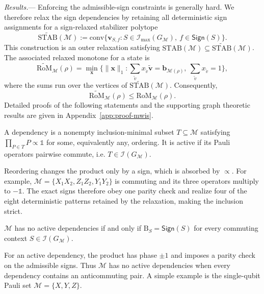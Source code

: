 \documentclass[10pt,aps,pra,twocolumn,floatfix,nofootinbib,superscriptaddress,longbibliography]{revtex4-2}
\newcommand{\Mcal}{\mathcal M}
\newcommand{\STAB}{\mathrm{STAB}}
\newcommand{\RoM}{\mathrm{RoM}}
\newcommand{\conv}{\mathrm{conv}}
\newcommand{\Ind}{\mathcal I}
\newcommand{\Bset}{\mathrm B}
\providecommand{\mathbm}[1]{\bm{#1}}
\begin{document}
	
	\emph{Results.}---
	\label{sec:results}
	Enforcing the admissible-sign constraints is generally hard.
	We therefore relax the sign dependencies by retaining all deterministic sign assignments for a sign-relaxed stabilizer polytope
	{\small
		\begin{equation}
			\widetilde{\STAB}(\Mcal)
			:=\conv\{\mathbm{v}_{S,f}:S\in\Ind_{\max}(G_\Mcal),\ f\in\mathsf{Sign}(S)\}.
			\label{eq:relaxed-polytope}
		\end{equation}
	}
	This construction is an outer relaxation satisfying $\STAB(\Mcal)\subseteq\widetilde{\STAB}(\Mcal)$.
	The associated relaxed monotone for a state is
	{\small
		\begin{equation}
			\widetilde{\RoM}_\Mcal(\rho)=\min_{\mathbm{x}}\!\Big\{\|\mathbm{x}\|_1:\!\textstyle\sum_{\tilde v}x_{\tilde v}\tilde{\mathbm{v}}=\mathbm{b}_{\Mcal(\rho)},\ \textstyle\sum_{\tilde v}x_{\tilde v}=1\Big\},
			\label{eq:relaxed-rom}
		\end{equation}
	}
	where the sums run over the vertices of $\widetilde{\STAB}(\Mcal)$.
	Consequently,
	\begin{equation}
		\widetilde{\RoM}_\Mcal(\rho)\le\RoM_\Mcal(\rho).
		\label{eq:relaxed-lower-bound}
	\end{equation}
	Detailed proofs of the following statements and the supporting graph theoretic results are given in Appendix~\ref{app:proof-mwis}.
	\begin{definition}
		\label{def:active}
		A dependency is a nonempty inclusion-minimal subset $T\subseteq\Mcal$ satisfying $\prod_{P\in T}P\propto\mathbb{1}$ for some, equivalently any, ordering.
		It is active if its Pauli operators pairwise commute, i.e. $T\in\Ind(G_\Mcal)$.
	\end{definition}
	Reordering changes the product only by a sign, which is absorbed by $\propto$. For example, $\Mcal=\{X_1X_2,Z_1Z_2,Y_1Y_2\}$ is commuting and its three operators multiply to $-\mathbb{1}$. The exact signs therefore obey one parity check and realize four of the eight deterministic patterns retained by the relaxation, making the inclusion strict.
	\begin{lemma}
		\label{lem:collapse}
		$\Mcal$ has no active dependencies if and only if $\Bset_S=\mathsf{Sign}(S)$ for every commuting context $S\in\Ind(G_\Mcal)$.
	\end{lemma}
	For an active dependency, the product has phase $\pm1$ and imposes a parity check on the admissible signs.
	Thus $\Mcal$ has no active dependencies when every dependency contains an anticommuting pair. A simple example is the single-qubit Pauli set $\Mcal = \{X, Y, Z\}$.
\end{document}

